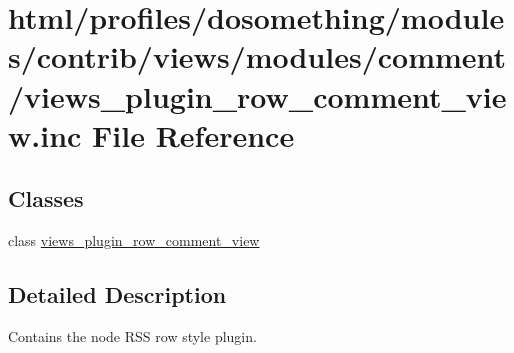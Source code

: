 \hypertarget{views__plugin__row__comment__view_8inc}{
\section{html/profiles/dosomething/modules/contrib/views/modules/comment/views\_\-plugin\_\-row\_\-comment\_\-view.inc File Reference}
\label{views__plugin__row__comment__view_8inc}
}
\subsection*{Classes}
\begin{DoxyCompactItemize}
\item 
class \hyperlink{classviews__plugin__row__comment__view}{views\_\-plugin\_\-row\_\-comment\_\-view}
\end{DoxyCompactItemize}


\subsection{Detailed Description}
Contains the node RSS row style plugin. 